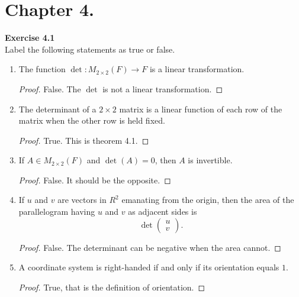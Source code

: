 \documentclass[12pt, a4paper]{article}
\theoremstyle{plain}
\newenvironment{exercise}[2][Exercise]
    { \begin{mdframed}[backgroundcolor=gray!20] \textbf{#1 #2} \\}
    {  \end{mdframed}}
\begin{document}
\section*{Chapter 4.}

\begin{exercise}{4.1}
Label the following statements as true or false.
	\begin{enumerate}[label=(\alph*)]
	\item The function $\det :M_{2\times 2}(F)\rightarrow F$ is a linear transformation.
		\begin{proof}
		False. The $\det$ is not a linear transformation.
		\end{proof}
	\item The determinant of a $2\times 2$ matrix is a linear function of each row of the matrix when the other row is held fixed.
		\begin{proof}
		True. This is theorem 4.1.
		\end{proof}
	\item If $A\in M_{2\times 2}(F)$ and $\det (A)=0$, then $A$ is invertible.
		\begin{proof}
		False. It should be the opposite.
		\end{proof}
	\item If $u$ and $v$ are vectors in $R^2$ emanating from the origin, then the area of the parallelogram having $u$ and $v$ as adjacent sides is 
	\[
	\det\begin{pmatrix}
	u\\
	v
	\end{pmatrix}.
	\]
		\begin{proof}
		False. The determinant can be negative when the area cannot.
		\end{proof}
	\item A coordinate system is right-handed if and only if its orientation equals $1$.
		\begin{proof}
		True, that is the definition of orientation.
		\end{proof}
	\end{enumerate}
\end{exercise}

\pagebreak
\end{document}
